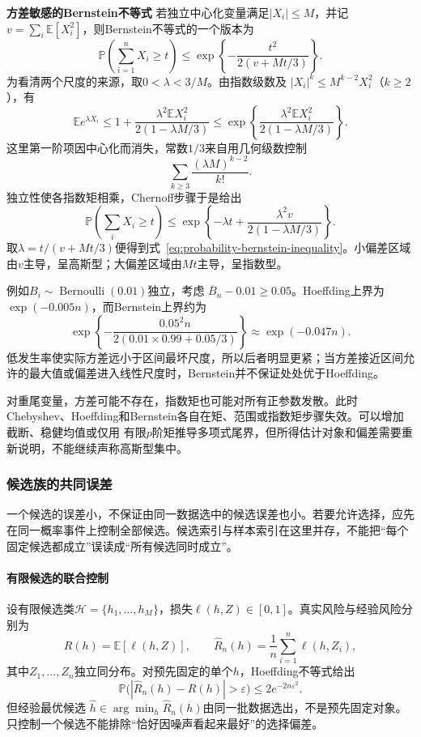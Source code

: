 \par\medskip\noindent\textbf{方差敏感的Bernstein不等式}\quad
若独立中心化变量满足\(|X_i|\leq M\)，并记\(v=\sum_i\mathbb{E}[X_i^2]\)，则Bernstein不等式的一个版本为
\begin{equation}
  \mathbb{P}\left(\sum_{i=1}^{n}X_i\geq t\right)
  \leq
  \exp\left\{
    -\frac{t^2}{2(v+Mt/3)}
  \right\}.
  \label{eq:probability-bernstein-inequality}
\end{equation}
为看清两个尺度的来源，取\(0<\lambda<3/M\)。由指数级数及
\(|X_i|^k\leq M^{k-2}X_i^2\)（\(k\geq2\)），有
\[
  \mathbb{E}e^{\lambda X_i}
  \leq
  1+\frac{\lambda^2\mathbb{E}X_i^2}
           {2(1-\lambda M/3)}
  \leq
  \exp\left\{
    \frac{\lambda^2\mathbb{E}X_i^2}
         {2(1-\lambda M/3)}
  \right\}.
\]
这里第一阶项因中心化而消失，常数\(1/3\)来自用几何级数控制
\[
  \sum_{k\geq3}\frac{(\lambda M)^{k-2}}{k!}.
\]
独立性使各指数矩相乘，Chernoff步骤于是给出
\[
  \mathbb{P}\left(\sum_iX_i\geq t\right)
  \leq
  \exp\left\{
    -\lambda t+\frac{\lambda^2v}
      {2(1-\lambda M/3)}
  \right\}.
\]
取\(\lambda=t/(v+Mt/3)\)便得到式~\eqref{eq:probability-bernstein-inequality}。小偏差区域由\(v\)主导，呈高斯型；大偏差区域由\(Mt\)主导，呈指数型。

例如\(B_i\sim\operatorname{Bernoulli}(0.01)\)独立，考虑
\(\overline{B}_n-0.01\geq0.05\)。Hoeffding上界为
\(\exp(-0.005n)\)，而Bernstein上界约为
\[
  \exp\left\{
    -\frac{0.05^2n}
      {2(0.01\times0.99+0.05/3)}
  \right\}
  \approx \exp(-0.047n).
\]
低发生率使实际方差远小于区间最坏尺度，所以后者明显更紧；当方差接近区间允许的最大值或偏差进入线性尺度时，Bernstein并不保证处处优于Hoeffding。

对重尾变量，方差可能不存在，指数矩也可能对所有正参数发散。此时Chebyshev、Hoeffding和Bernstein各自在矩、范围或指数矩步骤失效。可以增加截断、稳健均值或仅用
有限\(p\)阶矩推导多项式尾界，但所得估计对象和偏差需要重新说明，不能继续声称高斯型集中。

\subsubsection{候选族的共同误差}
\label{sec:probability-uniform-errors-symmetry}
\label{sec:probability-random-functions-uniform-error}
一个候选的误差小，不保证由同一数据选中的候选误差也小。若要允许选择，应先在同一概率事件上控制全部候选。候选索引与样本索引在这里并存，不能把“每个固定候选都成立”误读成“所有候选同时成立”。

\paragraph{有限候选的联合控制}
设有限候选类\(\mathcal{H}=\{h_1,\ldots,h_M\}\)，损失\(\ell(h,Z)\in[0,1]\)。真实风险与经验风险分别为
\[ R(h)=\mathbb{E}[\ell(h,Z)],
  \qquad\widehat{R}_n(h)=\frac{1}{n}\sum_{i=1}^{n}\ell(h,Z_i), \]
其中\(Z_1,\ldots,Z_n\)独立同分布。对预先固定的单个\(h\)，Hoeffding不等式给出
\[ \mathbb{P}\bigl(
    |\widehat{R}_n(h)-R(h)|>\varepsilon\bigr)\leq 2e^{-2n\varepsilon^2}. \]
但经验最优候选
\(\widehat{h}\in\arg\min_h\widehat{R}_n(h)\)由同一批数据选出，不是预先固定对象。只控制一个候选不能排除“恰好因噪声看起来最好”的选择偏差。

